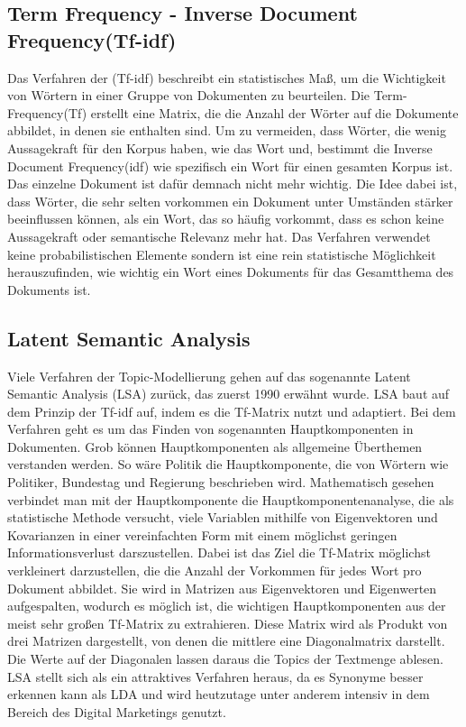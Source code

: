\documentclass[german,version-2020-11]{uzl-thesis}
\begin{document}
\subsection{Term Frequency - Inverse Document Frequency(Tf-idf)}
Das Verfahren der (Tf-idf) beschreibt ein statistisches Maß, um die Wichtigkeit von Wörtern in einer Gruppe von Dokumenten zu beurteilen. Die Term-Frequency(Tf) erstellt eine Matrix, die die Anzahl der Wörter auf die Dokumente abbildet, in denen sie enthalten sind. Um zu vermeiden, dass Wörter, die wenig Aussagekraft für den Korpus haben, wie das Wort \glqq und\grqq, bestimmt die Inverse Document Frequency(idf) wie spezifisch ein Wort für einen gesamten Korpus ist. Das einzelne Dokument ist dafür demnach nicht mehr wichtig. Die Idee dabei ist, dass Wörter, die sehr selten vorkommen ein Dokument unter Umständen stärker beeinflussen können, als ein Wort, das so häufig vorkommt, dass es schon keine Aussagekraft oder semantische Relevanz mehr hat. Das Verfahren verwendet keine probabilistischen Elemente sondern ist eine rein statistische Möglichkeit herauszufinden, wie wichtig ein Wort eines Dokuments für das Gesamtthema des Dokuments ist. 

\subsection{Latent Semantic Analysis}
Viele Verfahren der Topic-Modellierung gehen auf das sogenannte Latent Semantic Analysis (LSA) zurück, das zuerst 1990 erwähnt wurde. LSA baut auf dem Prinzip der Tf-idf auf, indem es die Tf-Matrix nutzt und adaptiert. Bei dem Verfahren geht es um das Finden von sogenannten Hauptkomponenten in Dokumenten. Grob können Hauptkomponenten als allgemeine Überthemen verstanden werden. So wäre Politik die Hauptkomponente, die von Wörtern wie Politiker, Bundestag und Regierung beschrieben wird. Mathematisch gesehen verbindet man mit der Hauptkomponente die Hauptkomponentenanalyse, die als statistische Methode versucht, viele Variablen mithilfe von Eigenvektoren und Kovarianzen in einer vereinfachten Form mit einem möglichst geringen Informationsverlust darszustellen. Dabei ist das Ziel die Tf-Matrix möglichst verkleinert darzustellen, die die Anzahl der Vorkommen für jedes Wort pro Dokument abbildet. Sie wird in Matrizen aus Eigenvektoren und Eigenwerten aufgespalten, wodurch es möglich ist, die wichtigen Hauptkomponenten aus der meist sehr großen Tf-Matrix zu extrahieren. Diese Matrix wird als Produkt von drei Matrizen dargestellt, von denen die mittlere eine Diagonalmatrix darstellt. Die Werte auf der Diagonalen lassen daraus die Topics der Textmenge ablesen. LSA stellt sich als ein attraktives Verfahren heraus, da es Synonyme besser erkennen kann als LDA und wird heutzutage unter anderem intensiv in dem Bereich des Digital Marketings genutzt. 
\end{document}
